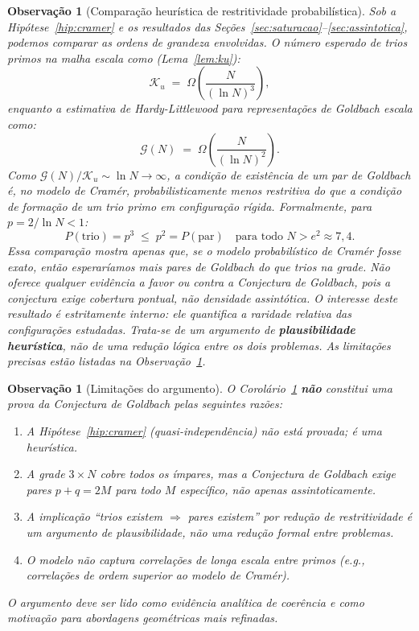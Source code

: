 \documentclass{article}
\newtheorem{remark}[proposition]{Observação}
\begin{document}
	\begin{remark}[Comparação heurística de restritividade probabilística]
		\label{obs:goldbach}
		Sob a Hipótese~\ref{hip:cramer} e os resultados das
		Seções~\ref{sec:saturacao}--\ref{sec:assintotica}, podemos
		comparar as ordens de grandeza envolvidas. O número esperado de
		trios primos na malha escala como (Lema~\ref{lem:ku}):
		\[
		\mathcal{K}_u \;=\; \Omega\!\left(\frac{N}{(\ln N)^3}\right),
		\]
		enquanto a estimativa de Hardy-Littlewood para representações
		de Goldbach escala como:
		\[
		\mathcal{G}(N) \;=\; \Omega\!\left(\frac{N}{(\ln N)^2}\right).
		\]
		Como $\mathcal{G}(N)/\mathcal{K}_u \sim \ln N \to \infty$,
		a condição de existência de um par de Goldbach é, no modelo
		de Cramér, probabilisticamente menos restritiva do que a
		condição de formação de um trio primo em configuração rígida.
		Formalmente, para $p = 2/\ln N < 1$:
		\[
		P(\text{trio}) = p^3 \;\leq\; p^2 = P(\text{par})
		\quad \text{para todo } N > e^2 \approx 7{,}4.
		\]
		Essa comparação mostra apenas que, se o modelo probabilístico de Cramér fosse exato, então esperaríamos mais pares de Goldbach do que trios na grade. Não oferece qualquer evidência a favor ou contra a Conjectura de Goldbach, pois a conjectura exige cobertura pontual, não densidade assintótica. O interesse deste resultado é estritamente interno: ele quantifica a raridade relativa das configurações estudadas. Trata-se de um argumento de \textbf{plausibilidade
			heurística}, não de uma redução lógica entre os dois problemas.
		As limitações precisas estão listadas na
		Observação~\ref{obs:limitacoes}.
	\end{remark}
	
	\begin{remark}[Limitações do argumento]
		\label{obs:limitacoes}
		O Corolário~\ref{obs:goldbach} \textbf{não} constitui uma prova
		da Conjectura de Goldbach pelas seguintes razões:
		\begin{enumerate}
			\item A Hipótese~\ref{hip:cramer} (quasi-independência) não está
			provada; é uma heurística.
			\item A grade $3 \times N$ cobre todos os ímpares, mas
			a Conjectura de Goldbach exige pares $p + q = 2M$ para
			\emph{todo} $M$ específico, não apenas assintoticamente.
			\item A implicação ``trios existem $\Rightarrow$ pares existem''
			por redução de restritividade é um argumento de
			\emph{plausibilidade}, não uma redução formal entre problemas.
			\item O modelo não captura correlações de longa escala entre
			primos (e.g., correlações de ordem superior ao modelo de Cramér).
		\end{enumerate}
		O argumento deve ser lido como evidência analítica de coerência
		e como motivação para abordagens geométricas mais refinadas.
	\end{remark}
	
\end{document}
